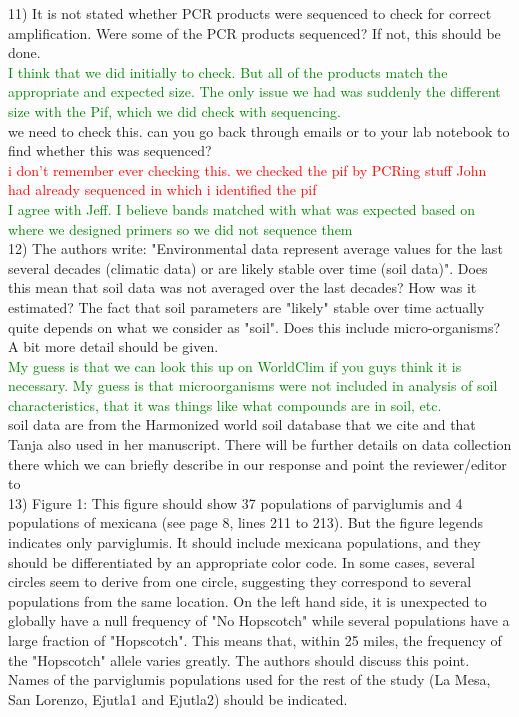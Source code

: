 \documentclass[11pt]{article}
\newcommand{\jri}[1]{\noindent \textcolor{red}{{#1}} \\}
\newcommand{\lev}[1]{\noindent \textcolor{green}{{#1}} \\}
\newcommand{\mbh}[1]{\noindent \textcolor{Dandelion}{{#1}}\\}
\begin{document}
11) It is not stated whether PCR products were sequenced to check for correct amplification. Were some of the PCR products sequenced? If not, this should be done.\\

\lev{I think that we did initially to check. But all of the products match the appropriate and expected size. The only issue we had was suddenly the different size with the Pif, which we did check with sequencing.}

\mbh{we need to check this.  can you go back through emails or to your lab notebook to find whether this was sequenced?}
\jri{i don't remember ever checking this. we checked the pif by PCRing stuff John had already sequenced in which i identified the pif}
\lev{I agree with Jeff. I believe bands matched with what was expected based on where we designed primers so we did not sequence them}

12) The authors write: "Environmental data represent average values for the last several decades (climatic data) or are likely stable over time (soil data)". Does this mean that soil data was not averaged over the last decades? How was it estimated? The fact that soil parameters are "likely" stable over time actually quite depends on what we consider as "soil". Does this include micro-organisms? A bit more detail should be given.\\

\lev{My guess is that we can look this up on WorldClim if you guys think it is necessary. My guess is that microorganisms were not included in analysis of soil characteristics, that it was things like what compounds are in soil, etc.}

\mbh{soil data are from the Harmonized world soil database that we cite and that Tanja also used in her manuscript.  There will be further details on data collection there which we can briefly describe in our response and point the reviewer/editor to}

13) Figure 1: This figure should show 37 populations of parviglumis and 4 populations of mexicana (see page 8, lines 211 to 213). But the figure legends indicates only parviglumis. It should include mexicana populations, and they should be differentiated by an appropriate color code. In some cases, several circles seem to derive from one circle, suggesting they correspond to several populations from the same location. On the left hand side, it is unexpected to globally have a null frequency of "No Hopscotch" while several populations have a large fraction of "Hopscotch". This means that, within 25 miles, the frequency of the "Hopscotch" allele varies greatly. The authors should discuss this point. Names of the parviglumis populations used for the rest of the study (La Mesa, San Lorenzo, Ejutla1 and Ejutla2) should be indicated.\\
\end{document}
